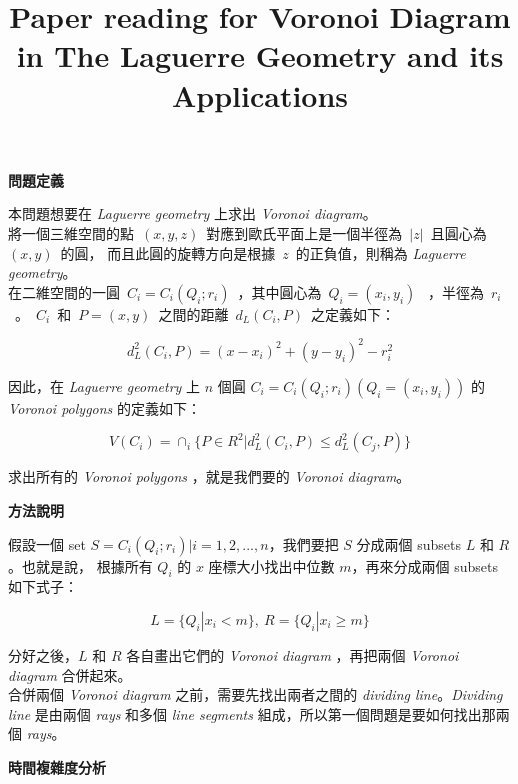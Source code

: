 \documentclass[12pt]{article}
\title{\bf{Paper reading for Voronoi Diagram in The Laguerre Geometry and its Applications}}
\date{}
\begin{document}
\maketitle

\begin{CJK}{UTF8}{bkai}

\centerline{\bf 問題定義}

本問題想要在 {\it Laguerre geometry} 上求出 {\it Voronoi diagram}。\\

將一個三維空間的點~$(x,y,z)$~對應到歐氏平面上是一個半徑為~$|z|$~且圓心為~$(x,y)$~的圓，
而且此圓的旋轉方向是根據~$z$~的正負值，則稱為 {\it Laguerre geometry}。\\

在二維空間的一圓~$C_i=C_i(Q_i;r_i)$~，其中圓心為~$Q_i=(x_i,y_i)$~
，半徑為~$r_i$~。~$C_i$~和~$P=(x,y)$~之間的距離~$d_L(C_i,P)$~之定義如下：

\begin{equation}
d_L^2(C_i,P)=(x-x_i)^2+(y-y_i)^2-r_i^2
\end{equation}

因此，在 {\it Laguerre geometry} 上 $n$ 個圓 $C_i=C_i(Q_i;r_i)(Q_i=(x_i,y_i))$ 的 {\it Voronoi polygons} 的定義如下：

\begin{equation}
V(C_i)=\cap_i \{P \in R^2 | d_L^2(C_i,P) \leq d_L^2(C_j,P) \}
\end{equation}

求出所有的 {\it Voronoi polygons} ，就是我們要的 {\it Voronoi diagram}。\\


\centerline{\bf 方法說明}

假設一個 set $S={C_i(Q_i;r_i)|i=1,2,...,n}$，我們要把 $S$ 分成兩個 subsets $L$ 和 $R$。也就是說，
根據所有 $Q_i$ 的 $x$ 座標大小找出中位數 $m$，再來分成兩個 subsets 如下式子：

\[
L=\{Q_i| x_i < m \},~R=\{Q_i| x_i \geq m \}
\]

分好之後，$L$ 和 $R$ 各自畫出它們的 {\it Voronoi diagram} ，再把兩個 {\it Voronoi diagram} 合併起來。\\


合併兩個 {\it Voronoi diagram} 之前，需要先找出兩者之間的 {\it dividing line}。{\it Dividing line}
 是由兩個 {\it rays} 和多個 {\it line segments} 組成，所以第一個問題是要如何找出那兩個 {\it rays}。\\



\centerline{\bf 時間複雜度分析}

\end{CJK}
\end{document}
